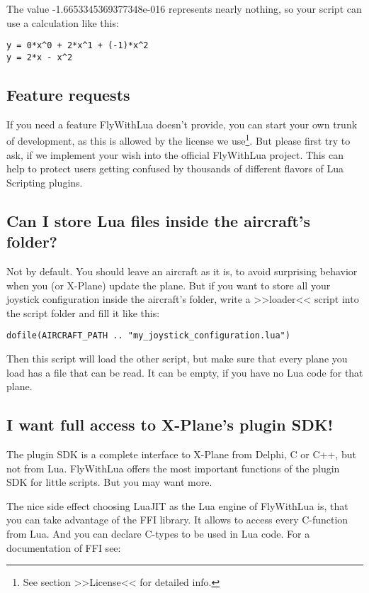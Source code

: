 \documentclass[11pt,parskip=half,a4paper]{scrartcl}
\begin{document}
The value -1.6653345369377348e-016 represents nearly nothing, so your script can use a calculation like this:

\verb|y = 0*x^0 + 2*x^1 + (-1)*x^2|\\
\verb|y = 2*x - x^2|

\subsection{Feature requests}

If you need a feature FlyWithLua doesn't provide, you can start your own trunk of development, as this is allowed by the license we use\footnote{See section >>License<< for detailed info.}. But please first try to ask, if we implement your wish into the official FlyWithLua project. This can help to protect users getting confused by thousands of different flavors of Lua Scripting plugins.

\subsection{Can I store Lua files inside the aircraft's folder?}

Not by default. You should leave an aircraft as it is, to avoid surprising behavior when you (or X-Plane) update the plane. But if you want to store all your joystick configuration inside the aircraft's folder, write a >>loader<< script into the script folder and fill it like this:

\begin{lstlisting}[firstnumber=1]
dofile(AIRCRAFT_PATH .. "my_joystick_configuration.lua")
\end{lstlisting}

Then this script will load the other script, but make sure that every plane you load has a file that can be read. It can be empty, if you have no Lua code for that plane.

\subsection{I want full access to X-Plane's plugin SDK!}

The plugin SDK is a complete interface to X-Plane from Delphi, C or C++, but not from Lua. FlyWithLua offers the most important functions of the plugin SDK for little scripts. But you may want more.

The nice side effect choosing LuaJIT as the Lua engine of FlyWithLua is, that you can take advantage of the FFI library. It allows to access every C-function from Lua. And you can declare C-types to be used in Lua code. For a documentation of FFI see:
\end{document}
